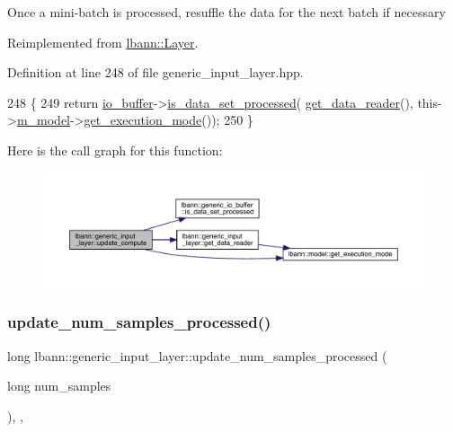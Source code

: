 Once a mini-\/batch is processed, resuffle the data for the next batch if necessary 

Reimplemented from \hyperlink{classlbann_1_1Layer_a70e08fc96a612f67ade6ba3809536d85}{lbann\+::\+Layer}.



Definition at line 248 of file generic\+\_\+input\+\_\+layer.\+hpp.


\begin{DoxyCode}
248                                  \{
249     \textcolor{keywordflow}{return} \hyperlink{classlbann_1_1generic__input__layer_a9dfe8b9afaebc7a5bcb0177ee2ab428f}{io\_buffer}->\hyperlink{classlbann_1_1generic__io__buffer_a9a038d40aec50dbc24c0abe21ad0c0a9}{is\_data\_set\_processed}(
      \hyperlink{classlbann_1_1generic__input__layer_aba732becdb02627e3ad4493ac19e8fb6}{get\_data\_reader}(), this->\hyperlink{classlbann_1_1Layer_a3d9315e99574166f2f33e37b572021d2}{m\_model}->\hyperlink{classlbann_1_1model_addb40597cf29aa6d31b6a7d09ef48608}{get\_execution\_mode}());
250   \}
\end{DoxyCode}
Here is the call graph for this function\+:\nopagebreak
\begin{figure}[H]
\begin{center}
\leavevmode
\includegraphics[width=350pt]{classlbann_1_1generic__input__layer_aaf9ac19f7dd725230bde87d859ec0f35_cgraph}
\end{center}
\end{figure}
\mbox{\label{classlbann_1_1generic__input__layer_a0c2f123432ec6af168012cc8699a1d3f}} 
\subsubsection{\texorpdfstring{update\+\_\+num\+\_\+samples\+\_\+processed()}{update\_num\_samples\_processed()}}
{\footnotesize\ttfamily long lbann\+::generic\+\_\+input\+\_\+layer\+::update\+\_\+num\+\_\+samples\+\_\+processed (\begin{DoxyParamCaption}\item[{long}]{num\+\_\+samples }\end{DoxyParamCaption})\hspace{0.3cm}{\ttfamily [inline]}, {\ttfamily [override]}, {\ttfamily [virtual]}}

